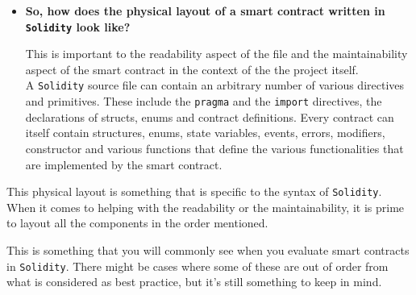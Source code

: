 \begin{itemize}
\item
  \textbf{So, how does the physical layout of a smart contract written
  in \texttt{Solidity} look like?}

  This is important to the readability aspect of the file and the
  maintainability aspect of the smart contract in the context of the the
  project itself.\\

  A \texttt{Solidity} source file can contain an arbitrary number of
  various directives and primitives. These include the \texttt{pragma}
  and the \texttt{import} directives, the declarations of structs, enums
  and contract definitions. Every contract can itself contain
  structures, enums, state variables, events, errors, modifiers,
  constructor and various functions that define the various
  functionalities that are implemented by the smart contract.
\end{itemize}

This physical layout is something that is specific to the syntax of
\texttt{Solidity}. When it comes to helping with the readability or the
maintainability, it is prime to layout all the components in the order
mentioned.

This is something that you will commonly see when you evaluate smart
contracts in \texttt{Solidity}. There might be cases where some of these
are out of order from what is considered as best practice, but it's
still something to keep in mind.
